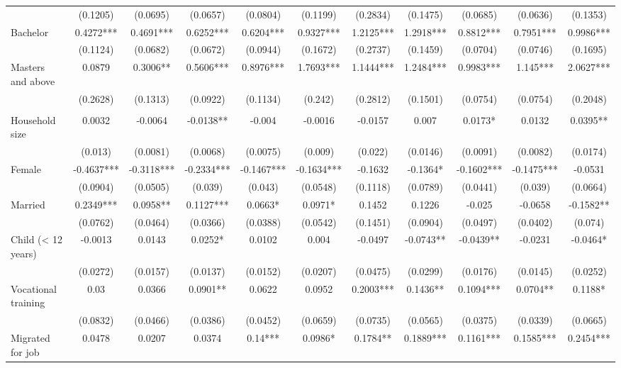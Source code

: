 \begin{table}[htbp]
{\begin{tabular}{lcccccccccc}
& (0.1205) & (0.0695) & (0.0657) & (0.0804) & (0.1199) & (0.2834) & (0.1475) & (0.0685) & (0.0636) & (0.1353) \\ 
\hspace{1em}Bachelor & 0.4272*** & 0.4691*** & 0.6252*** & 0.6204*** & 0.9327*** & 1.2125*** & 1.2918*** & 0.8812*** & 0.7951*** & 0.9986*** \\
& (0.1124) & (0.0682) & (0.0672) & (0.0944) & (0.1672) & (0.2737) & (0.1459) & (0.0704) & (0.0746) & (0.1695) \\ 
\hspace{1em}Masters and above & 0.0879 & 0.3006** & 0.5606*** & 0.8976*** & 1.7693*** & 1.1444*** & 1.2484*** & 0.9983*** & 1.145*** & 2.0627*** \\
& (0.2628) & (0.1313) & (0.0922) & (0.1134) & (0.242) & (0.2812) & (0.1501) & (0.0754) & (0.0754) & (0.2048) \\ 
\text{} &&&&&&&&&&\\
Household size & 0.0032 & -0.0064 & -0.0138** & -0.004 & -0.0016 & -0.0157 & 0.007 & 0.0173* & 0.0132 & 0.0395** \\
& (0.013) & (0.0081) & (0.0068) & (0.0075) & (0.009) & (0.022) & (0.0146) & (0.0091) & (0.0082) & (0.0174) \\ 
Female & -0.4637*** & -0.3118*** & -0.2334*** & -0.1467*** & -0.1634*** & -0.1632 & -0.1364* & -0.1602*** & -0.1475*** & -0.0531 \\
& (0.0904) & (0.0505) & (0.039) & (0.043) & (0.0548) & (0.1118) & (0.0789) & (0.0441) & (0.039) & (0.0664) \\ 
Married & 0.2349*** & 0.0958** & 0.1127*** & 0.0663* & 0.0971* & 0.1452 & 0.1226 & -0.025 & -0.0658 & -0.1582** \\
& (0.0762) & (0.0464) & (0.0366) & (0.0388) & (0.0542) & (0.1451) & (0.0904) & (0.0497) & (0.0402) & (0.074) \\ 
Child (< 12 years) & -0.0013 & 0.0143 & 0.0252* & 0.0102 & 0.004 & -0.0497 & -0.0743** & -0.0439** & -0.0231 & -0.0464* \\
& (0.0272) & (0.0157) & (0.0137) & (0.0152) & (0.0207) & (0.0475) & (0.0299) & (0.0176) & (0.0145) & (0.0252) \\ 
Vocational training & 0.03 & 0.0366 & 0.0901** & 0.0622 & 0.0952 & 0.2003*** & 0.1436** & 0.1094*** & 0.0704** & 0.1188* \\
& (0.0832) & (0.0466) & (0.0386) & (0.0452) & (0.0659) & (0.0735) & (0.0565) & (0.0375) & (0.0339) & (0.0665) \\ 
Migrated for job & 0.0478 & 0.0207 & 0.0374 & 0.14*** & 0.0986* & 0.1784** & 0.1889*** & 0.1161*** & 0.1585*** & 0.2454*** \\

\end{tabular}}
\end{table}
